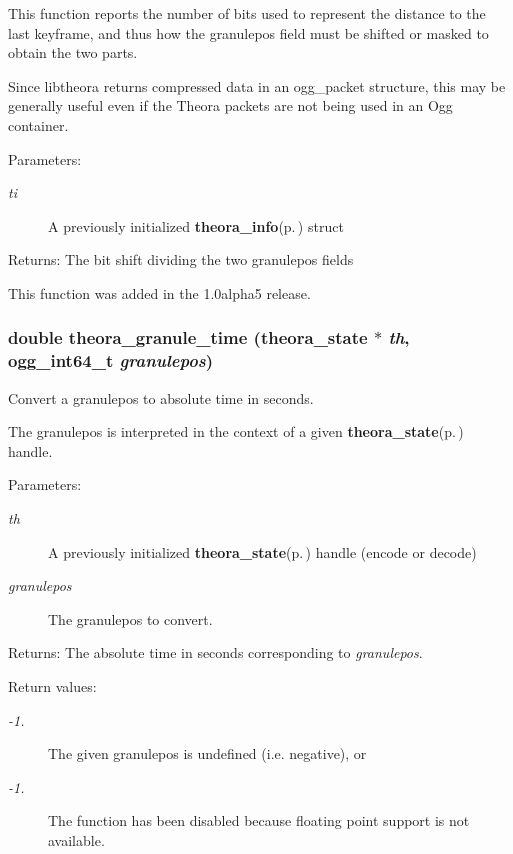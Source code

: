 This function reports the number of bits used to represent the distance to the last keyframe, and thus how the granulepos field must be shifted or masked to obtain the two parts.

Since libtheora returns compressed data in an ogg\_\-packet structure, this may be generally useful even if the Theora packets are not being used in an Ogg container.

\begin{Desc}
\item[Parameters:]
\begin{description}
\item[{\em ti}]A previously initialized {\bf theora\_\-info}{\rm (p.\,\pageref{structtheora__info})} struct \end{description}
\end{Desc}
\begin{Desc}
\item[Returns:]The bit shift dividing the two granulepos fields\end{Desc}
This function was added in the 1.0alpha5 release. 
\subsubsection{\setlength{\rightskip}{0pt plus 5cm}double theora\_\-granule\_\-time ({\bf theora\_\-state} $\ast$ {\em th}, ogg\_\-int64\_\-t {\em granulepos})}\label{theora_8h_56a89dbe9051fe6a3b7b31a6812df77d}


Convert a granulepos to absolute time in seconds. 

The granulepos is interpreted in the context of a given {\bf theora\_\-state}{\rm (p.\,\pageref{structtheora__state})} handle. \begin{Desc}
\item[Parameters:]
\begin{description}
\item[{\em th}]A previously initialized {\bf theora\_\-state}{\rm (p.\,\pageref{structtheora__state})} handle (encode or decode) \item[{\em granulepos}]The granulepos to convert. \end{description}
\end{Desc}
\begin{Desc}
\item[Returns:]The absolute time in seconds corresponding to {\em granulepos\/}. \end{Desc}
\begin{Desc}
\item[Return values:]
\begin{description}
\item[{\em -1.}]The given granulepos is undefined (i.e. negative), or \item[{\em -1.}]The function has been disabled because floating point support is not available. \end{description}
\end{Desc}
